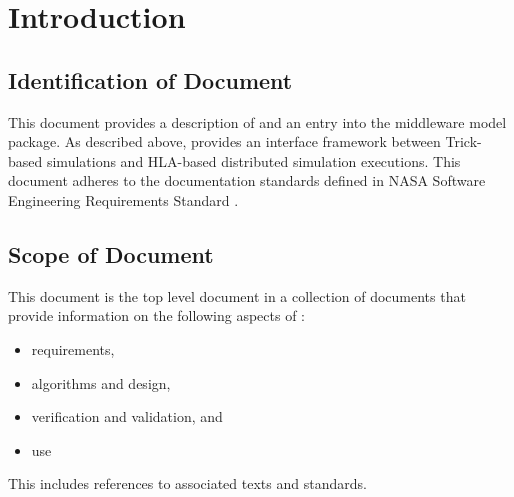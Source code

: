 \documentclass[twoside,11pt,titlepage]{report}
\begin{document}

\date{June 2020}
\modelname{\TrickHLA}
\doctype{}
\author{Edwin Z. Crues \\ and \\ Daniel E. Dexter}
\makeTrickhlaenvTitlepage



\tableofcontents
\vfill

\pagebreak


\chapter{Introduction}


\section{Identification of Document}
This document provides a description of and an entry into the \TrickHLA
middleware model package.  As described above, \TrickHLA provides an interface
framework between Trick-based simulations and HLA-based distributed simulation
executions.  This document adheres to the documentation standards defined in
NASA Software Engineering Requirements Standard \cite{NASA:SWE}.

\section{Scope of Document}
This document is the top level document in a collection of documents that
provide information on the following aspects of \TrickHLA :
\begin{itemize}
\item requirements,
\item algorithms and design,
\item verification and validation, and
\item use
\end{itemize}
This includes references to associated texts and standards.
\end{document}

